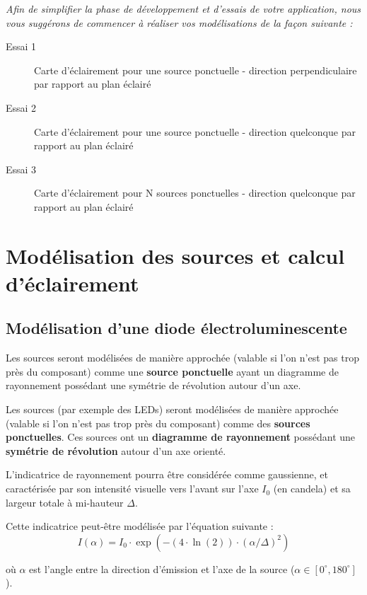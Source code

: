 \medskip

\textit{Afin de simplifier la phase de développement et d'essais de votre application, nous vous suggérons de commencer à réaliser vos modélisations de la façon suivante : }

\begin{description}
	\item[Essai 1] Carte d'éclairement pour une source ponctuelle - direction perpendiculaire par rapport au plan éclairé
	\item[Essai 2] Carte d'éclairement pour une source ponctuelle - direction quelconque par rapport au plan éclairé
	\item[Essai 3] Carte d'éclairement pour N sources ponctuelles - direction quelconque par rapport au plan éclairé
\end{description}

\section{Modélisation des sources et calcul d'éclairement}

\subsection{Modélisation d'une diode électroluminescente}


Les sources seront modélisées de manière approchée (valable si l'on n'est pas trop près du composant) comme une \textbf{source ponctuelle} ayant un diagramme de rayonnement possédant une symétrie de révolution autour d'un axe.

Les sources (par exemple des LEDs) seront modélisées de manière approchée (valable si l'on n'est pas trop près du composant) comme des \textbf{sources ponctuelles}. Ces sources ont un \textbf{diagramme de rayonnement} possédant une \textbf{symétrie de révolution} autour d'un axe orienté. 

\medskip

L'indicatrice de rayonnement pourra être considérée comme gaussienne, et caractérisée par son intensité visuelle vers l'avant sur l'axe $I_0$ (en candela) et sa largeur totale à mi-hauteur $\Delta$.

Cette indicatrice peut-être modélisée par l'équation suivante : $$I(\alpha) = I_0 \cdot \exp(-(4 \cdot \ln(2)) \cdot (\alpha/\Delta)^2)$$

où $\alpha$ est l'angle entre la direction d'émission et l'axe de la source ($\alpha \in [0^{\circ}, 180^{\circ}]$). 

